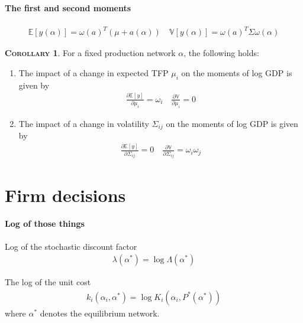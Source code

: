\documentclass[11pt]{article}
\theoremstyle{definition}
\newtheorem{cor}{\noindent \textbf{\textsc{Corollary}}}
\begin{document}
	
	\paragraph{The first and second moments}
	\begin{align}
		\mathbb{E}[y(\alpha)] = \omega(a)^T (\mu + a(\alpha)) \quad \mathbb{V}[y(\alpha)] = \omega (a)^T \Sigma\omega(\alpha) \label{eq-14}
	\end{align}
	
	
	\begin{cor}
		For a fixed production network $\alpha$, the following holds:
		\begin{enumerate}[leftmargin=1cm, label=\arabic*.]
			\item The impact of a change in expected TFP $\mu_i$ on the moments of log GDP is given by
			\begin{align*}
				\frac{\partial\mathbb{E}[y]}{\partial \mu_i} = \omega_i \quad \frac{\partial \mathbb{V}}{\partial\mu_i} = 0
			\end{align*}
			\item The impact of a change in volatility $\Sigma_{ij}$ on the moments of log GDP is given by
			\begin{align*}
				\frac{\partial\mathbb{E}[y]}{\partial \Sigma_{ij}} = 0 \quad \frac{\partial \mathbb{V}}{\partial\Sigma_{ij}} = \omega_i\omega_j
			\end{align*}
		\end{enumerate}
	\end{cor}
	
	
	\section{Firm decisions}
	\paragraph{Log of those things}
	Log of the stochastic discount factor
	\begin{align*}
		\lambda(\alpha^*) = \log\Lambda(\alpha^*)
	\end{align*}
	
	The log of the unit cost
	\begin{align*}
		k_i(\alpha_i,\alpha^*) = \log K_i(\alpha_i, P^*(\alpha^*))
	\end{align*}
	where $\alpha^*$ denotes the equilibrium network.
	
\end{document}
